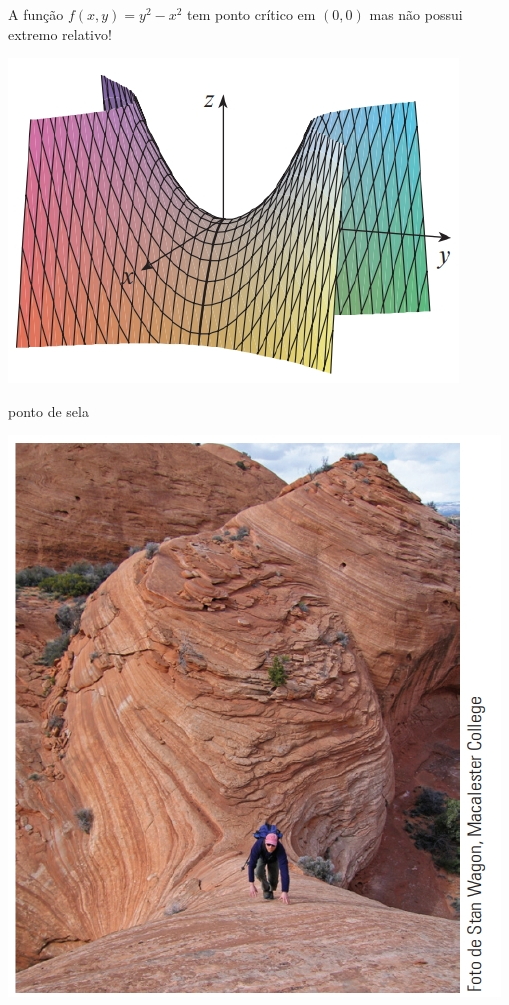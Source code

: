 \begin{frame}[label=otimizacao]
\begin{exe} A função $f(x,y)=y^2-x^2$ tem ponto crítico em $(0,0)$ mas não possui extremo relativo!
 \end{exe} 
 \begin{minipage}{0.5\textwidth}
 \includegraphics[scale=.5]{figuras/sela.png}
 \begin{center}
 
 ponto de sela
 \end{center}
 \end{minipage}
  \begin{minipage}{0.2\textwidth}
  \includegraphics[scale=.4]{figuras/sela-montanha.png}
  \end{minipage}
\end{frame}



